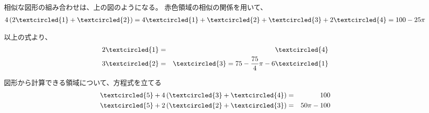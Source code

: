 相似な図形の組み合わせは、上の図のようになる。
赤色領域の相似の関係を用いて、
\begin{eqnarray}
4 \left( 2 \textcircled{1} + \textcircled{2} \right)= 4 \textcircled{1}+ \textcircled{2} + \textcircled{3} +2 \textcircled{4} = 100 - 25 \pi
\end{eqnarray}

以上の式より、
\begin{eqnarray}
2 \textcircled{1} &=& \textcircled{4}\\
3 \textcircled{2} &=& \textcircled{3} = 75 - \frac{75}{4} \pi -6 \textcircled{1}
\end{eqnarray}

図形から計算できる領域について、方程式を立てる
\begin{eqnarray}
\textcircled{5} + 4 \left( \textcircled{3} + \textcircled{4} \right) &=& 100\\
\textcircled{5} + 2 \left( \textcircled{2} + \textcircled{3} \right) &=& 50 \pi - 100
\end{eqnarray}
